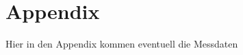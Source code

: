 \newpage
\section{Appendix}
\label{sec:Appendix}

Hier in den Appendix kommen eventuell die Messdaten